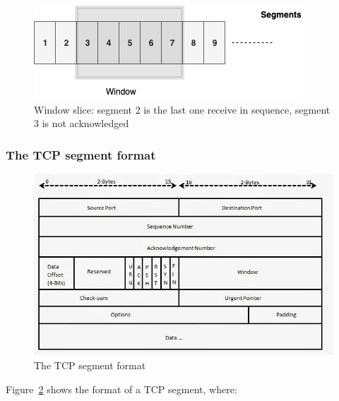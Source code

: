 \documentclass[a4paper, 11pt]{article}
\begin{document}
\begin{figure}
\includegraphics[scale=0.6]{window-slice.png}
\caption{Window slice: segment 2 is the last one receive in sequence, segment 3 is not acknowledged}
\label{fig:window-slice}
\end{figure}

\subsubsection{The TCP segment format}

\begin{figure}[h]
\includegraphics[scale=0.6]{tcp-segment-format.jpg}
\caption{The TCP segment format}
\label{fig:tcp-segment-format}
\end{figure}

Figure~\ref{fig:tcp-segment-format} shows the format of a TCP segment, where:
\end{document}
